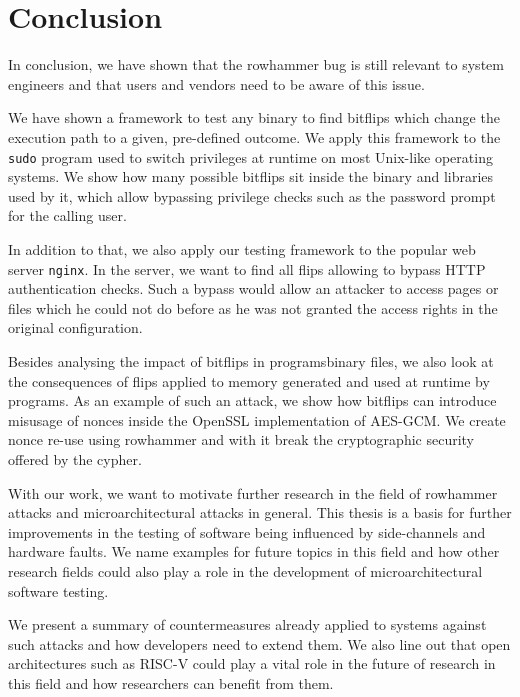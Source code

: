 \chapter{Conclusion}\label{sec:conclusion}

In conclusion, we have shown that the rowhammer bug is still relevant to system
engineers and that users and vendors need to be aware of this issue.

We have shown a framework to test any binary to find bitflips which change the
execution path to a given, pre-defined outcome. We apply this framework to the
\texttt{sudo} program used to switch privileges at runtime on most Unix-like
operating systems. We show how many possible bitflips sit inside the binary and
libraries used by it, which allow bypassing privilege checks such as the
password prompt for the calling user.

In addition to that, we also apply our testing framework to the popular web
server \texttt{nginx}. In the server, we want to find all flips allowing to
bypass HTTP authentication checks. Such a bypass would allow an attacker to
access pages or files which he could not do before as he was not granted the
access rights in the original configuration.

Besides analysing the impact of bitflips in programs\textquotesingle binary
files, we also look at the consequences of flips applied to memory generated
and used at runtime by programs. As an example of such an attack, we show how
bitflips can introduce misusage of nonces inside the OpenSSL implementation of
AES-GCM. We create nonce re-use using rowhammer and with it break the
cryptographic security offered by the cypher.

With our work, we want to motivate further research in the field of rowhammer
attacks and microarchitectural attacks in general. This thesis is a basis for
further improvements in the testing of software being influenced by
side-channels and hardware faults. We name examples for future topics in this
field and how other research fields could also play a role in the development of
microarchitectural software testing.

We present a summary of countermeasures already applied to systems against such
attacks and how developers need to extend them. We also line out that open
architectures such as RISC-V could play a vital role in the future of research
in this field and how researchers can benefit from them.

